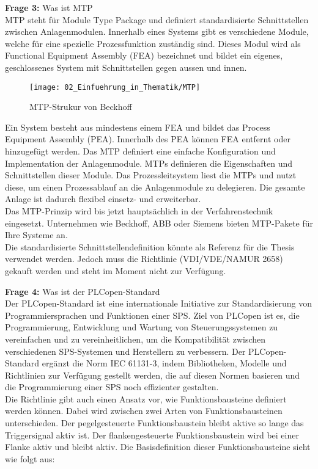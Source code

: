 	\newpage
	
	\textbf{Frage 3:} Was ist MTP \vspace{2mm} 
	\\
	MTP steht für Module Type Package und definiert standardisierte Schnittstellen zwischen Anlagenmodulen. Innerhalb eines Systems gibt es verschiedene Module, welche für eine spezielle Prozessfunktion zuständig sind. Dieses Modul wird als Functional Equipment Assembly (FEA) bezeichnet und bildet ein eigenes, geschlossenes System mit Schnittstellen gegen aussen und innen.
	\begin{figure}[h!]
		\centering
		\texttt{[image: 02\_Einfuehrung\_in\_Thematik/MTP]}
		\captionsetup{justification=centering}
		\caption{MTP-Strukur von Beckhoff}
		\label{fig:MTP}
	\end{figure}
	Ein System besteht aus mindestens einem FEA und bildet das Process Equipment Assembly (PEA). Innerhalb des PEA können FEA entfernt oder hinzugefügt werden. Das MTP definiert eine einfache Konfiguration und Implementation der Anlagenmodule. MTPs definieren die Eigenschaften und Schnittstellen dieser Module. Das Prozessleitsystem liest die MTPs und nutzt diese, um einen Prozessablauf an die Anlagenmodule zu delegieren. Die gesamte Anlage ist dadurch flexibel einsetz- und erweiterbar.
	\\  
	Das MTP-Prinzip wird bis jetzt hauptsächlich in der Verfahrenstechnik eingesetzt. Unternehmen wie Beckhoff, ABB oder Siemens bieten MTP-Pakete für Ihre Systeme an. 
	\\
	Die standardisierte Schnittstellendefinition könnte als Referenz für die Thesis verwendet werden. Jedoch muss die Richtlinie (VDI/VDE/NAMUR 2658) gekauft werden und steht im Moment nicht zur Verfügung. 
	\vspace{3mm}
	
	\textbf{Frage 4:} Was ist der PLCopen-Standard  \vspace{2mm} 
	\\
	Der PLCopen-Standard ist eine internationale Initiative zur Standardisierung von Programmiersprachen und Funktionen einer SPS. Ziel von PLCopen ist es, die Programmierung, Entwicklung und Wartung von Steuerungssystemen zu vereinfachen und zu vereinheitlichen, um die Kompatibilität zwischen verschiedenen SPS-Systemen und Herstellern zu verbessern. Der PLCopen-Standard ergänzt die Norm IEC 61131-3, indem Bibliotheken, Modelle und Richtlinien zur Verfügung gestellt werden, die auf diesen Normen basieren und die Programmierung einer SPS noch effizienter gestalten.
	\\
	Die Richtlinie gibt auch einen Ansatz vor, wie Funktionsbausteine definiert werden können. Dabei wird zwischen zwei Arten von Funktionsbausteinen unterschieden. Der pegelgesteuerte Funktionsbaustein bleibt aktive so lange das Triggersignal aktiv ist. Der flankengesteuerte Funktionsbaustein wird bei einer Flanke aktiv und bleibt aktiv. Die Basisdefinition dieser Funktionsbausteine sieht wie folgt aus: 
	
